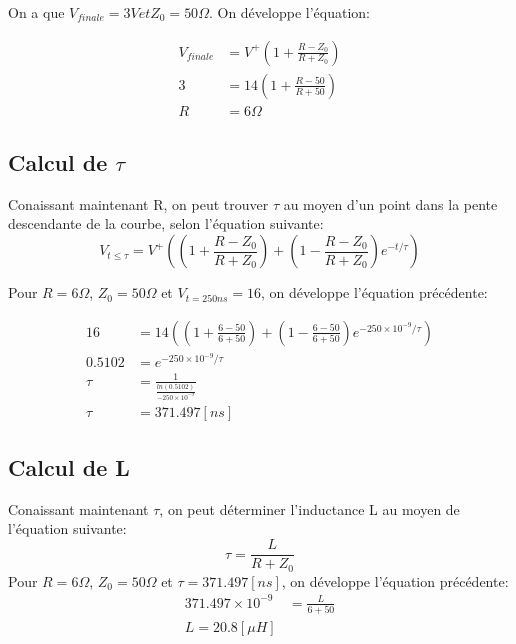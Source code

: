 On a que $V_{finale} = 3V et Z_0 = 50 \Omega$. On développe l'équation:

\begin{align*}
V_{finale} &= V^{+} \left( 1 + \frac{R - Z_0}{R + Z_0}\right)\\
3 &= 14 \left( 1 + \frac{R - 50}{R + 50}\right)\\
R &= 6 \Omega
\end{align*}

\subsection*{Calcul de $\tau$}

Conaissant maintenant R, on peut trouver $\tau$ au moyen d'un point dans la pente descendante de la courbe, selon l'équation suivante:
\begin{equation}
V_{t\leq \tau} = V^{+} \left( \left(1 + \frac{R - Z_0}{R + Z_0}\right) + \left(1 -\frac{R - Z_0}{R + Z_0}\right) e^{-t/\tau} \right)
\end{equation}

Pour $R=6 \Omega$, $Z_0 = 50 \Omega$ et $V_{t= 250ns} = 16$, on développe l'équation précédente:

\begin{align*}
16 &= 14 \left( \left(1 + \frac{6 - 50}{6 + 50}\right) + \left(1 -\frac{6 - 50}{6 + 50}\right) e^{-250 \times 10^{-9}/\tau} \right)\\
0.5102 &= e^{-250 \times 10^{-9}/\tau}\\
\tau   &= \frac{1}{\frac{ln(0.5102)}{-250 \times 10^{-9}}}\\
\tau   &= 371.497\left[ns\right]
\end{align*}

\subsection*{Calcul de L}

Conaissant maintenant $\tau$, on peut déterminer l'inductance L au moyen de l'équation suivante:
\begin{equation}
\tau = \frac{L}{R + Z_0}
\end{equation}
Pour $R = 6 \Omega$, $Z_0 = 50 \Omega$ et $\tau = 371.497\left[ns\right]$, on développe l'équation précédente:
\begin{align*}
371.497\times 10^{-9} &= \frac{L}{6 + 50}\\
L = 20.8 \left[\mu H\right]
\end{align*}
\newpage
